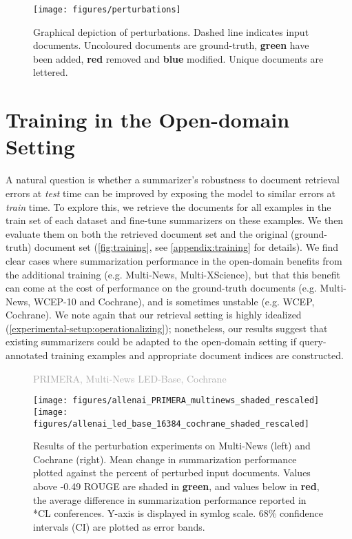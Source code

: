 \documentclass[11pt]{article}
\begin{document}
\begin{figure}[t]
\texttt{[image: figures/perturbations]}
\caption{Graphical depiction of perturbations. Dashed line indicates input documents. Uncoloured documents are ground-truth, \textcolor{MyGreen}{\textbf{green}} have been added, \textcolor{MyRed}{\textbf{red}} removed and \textcolor{MyBlue}{\textbf{blue}} modified. Unique documents are lettered.}
\label{fig:perturbations}
\vspace{-3.5mm}
\end{figure}

\vspace{-1.0mm}
\section{Training in the Open-domain Setting} \label{training}
\vspace{-1.0mm}

A natural question is whether a summarizer's robustness to document retrieval errors at \textit{test} time can be improved by exposing the model to similar errors at \textit{train} time. To explore this, we retrieve the documents for all examples in the train set of each dataset and fine-tune summarizers on these examples. We then evaluate them on both the retrieved document set and the original (ground-truth) document set (\autoref{fig:training}, see \autoref{appendix:training} for details). We find clear cases where summarization performance in the open-domain benefits from the additional training (e.g. Multi-News, Multi-XScience), but that this benefit can come at the cost of performance on the ground-truth documents (e.g. Multi-News, WCEP-10 and Cochrane), and is sometimes unstable (e.g. WCEP, Cochrane). We note again that our retrieval setting is highly idealized (\textsection \ref{experimental-setup:operationalizing}); nonetheless, our results suggest that existing summarizers could be adapted to the open-domain setting if query-annotated training examples and appropriate document indices are constructed.

\begin{figure*}[t]
\scriptsize{\qquad\quad\textcolor{darkgray}{\textsf{PRIMERA, Multi-News} \hspace{5cm} \textsf{LED-Base, Cochrane}}}
\centering
\centerline{
\texttt{[image: figures/allenai\_PRIMERA\_multinews\_shaded\_rescaled]}
\texttt{[image: figures/allenai\_led\_base\_16384\_cochrane\_shaded\_rescaled]}
}
\caption{Results of the perturbation experiments on Multi-News (left) and Cochrane (right). Mean change in summarization performance plotted against the percent of perturbed input documents. Values above -0.49 ROUGE are shaded in \textcolor{MyGreen}{\textbf{green}}, and values below in \textcolor{MyRed}{\textbf{red}}, the average difference in summarization performance reported in *CL conferences. Y-axis is displayed in symlog scale. 68\% confidence intervals (CI) are plotted as error bands.}
\label{fig:perturbation-results}
\vspace{-3.5mm}
\end{figure*}
\end{document}
